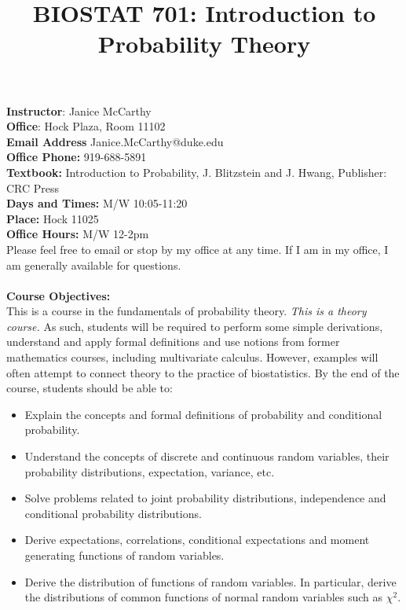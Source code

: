 \documentclass[12pt,a4paper]{article} %
\title{BIOSTAT 701: Introduction to Probability Theory }
\begin{document}
\maketitle

\noindent \textbf{Instructor}: Janice McCarthy\\
\noindent \textbf{Office}: Hock Plaza, Room 11102\\
\noindent \textbf{Email Address} Janice.McCarthy@duke.edu\\
\noindent \textbf{Office Phone:} 919-688-5891\\
\noindent \textbf{Textbook:} Introduction to Probability, J. Blitzstein and J. Hwang, Publisher: CRC Press\\
\noindent \textbf{Days and Times:} M/W 10:05-11:20\\
\noindent \textbf{Place:} Hock 11025\\
\noindent \textbf{Office Hours:} M/W 12-2pm\\

\noindent Please feel free to email or stop by my office at any time. If I am in my office, I am generally available for questions.\\\\
\noindent\textbf{Course Objectives:}\\
This is a course in the fundamentals of probability theory. \emph{This is a theory course.} As such, students will be required to perform some simple derivations, understand and apply formal definitions and use notions from former mathematics courses, including multivariate calculus. However, examples will often attempt to connect theory to the practice of biostatistics. By the end of the course, students should be able to:
\begin{itemize}
\item Explain the concepts and formal definitions of probability and conditional probability.
\item Understand the concepts of discrete and continuous random variables, their probability distributions, expectation, variance, etc.
\item Solve problems related to joint probability distributions, independence and conditional probability distributions.
\item Derive expectations, correlations, conditional expectations and moment generating functions of random variables.
\item Derive the distribution of functions of random variables. In particular, derive the distributions of common functions of normal random variables such as $\chi^2$.
\end{itemize}
\end{document}
